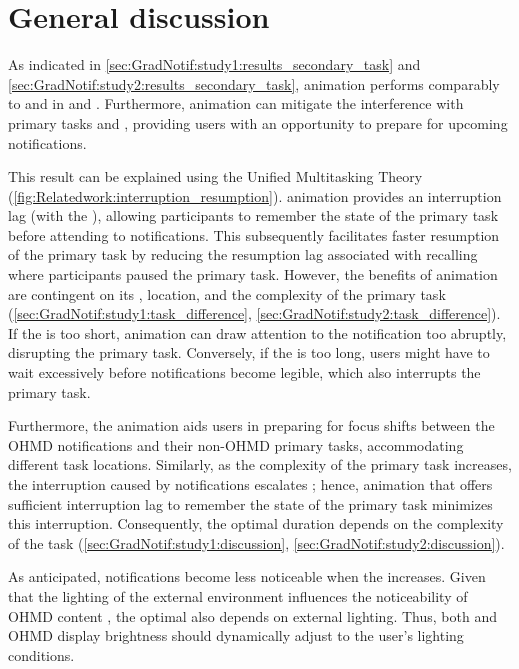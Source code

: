 \section{General discussion}
\label{sec:GradNotif:general_discussion}

As indicated in \autoref{sec:GradNotif:study1:results_secondary_task} and \autoref{sec:GradNotif:study2:results_secondary_task}, \fading{} animation performs comparably to \instant{} and \scroll{} in \Reaction{} and \Comprehension{}. Furthermore, \fading{} animation can mitigate the interference with primary tasks and \Interruption{}, providing users with an opportunity to prepare for upcoming notifications. 

This result can be explained using the Unified Multitasking Theory \cite{salvucci_toward_2009} (\autoref{fig:Relatedwork:interruption_resumption}). \Fading{} animation provides an interruption lag (with the \fadeduration{}), allowing participants to remember the state of the primary task before attending to notifications. This subsequently facilitates faster resumption of the primary task by reducing the resumption lag associated with recalling where participants paused the primary task. However, the benefits of \fading{} animation are contingent on its \fadeduration{}, location, and the complexity of the primary task (\autoref{sec:GradNotif:study1:task_difference}, \autoref{sec:GradNotif:study2:task_difference}). If the \fadeduration{} is too short, \fading{} animation can draw attention to the notification too abruptly, disrupting the primary task. Conversely, if the \fadeduration{} is too long, users might have to wait excessively before notifications become legible, which also interrupts the primary task.

Furthermore, the \fading{} animation aids users in preparing for focus shifts between the OHMD notifications and their non-OHMD primary tasks, accommodating different task locations. Similarly, as the complexity of the primary task increases, the interruption caused by notifications escalates \cite{bailey_effects_2001, borst_what_2015}; hence, \fading{} animation that offers sufficient interruption lag to remember the state of the primary task minimizes this interruption. Consequently, the optimal \fadeduration{} duration depends on the complexity of the task (\autoref{sec:GradNotif:study1:discussion}, \autoref{sec:GradNotif:study2:discussion}).

As anticipated, notifications become less noticeable when the \fadeduration{} increases. Given that the lighting of the external environment influences the noticeability of OHMD content \cite{erickson_exploring_2020}, the optimal \fadeduration{} also depends on external lighting. Thus, both \fadeduration{} and OHMD display brightness should dynamically adjust to the user's lighting conditions.

